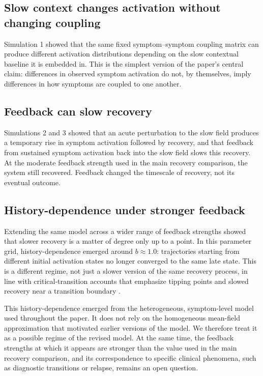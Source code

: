 \documentclass[man,12pt,floatsintext]{apa7}
\begin{document}
\subsection{Slow context changes activation without changing coupling}
Simulation 1 showed that the same fixed symptom--symptom coupling matrix can
produce different activation distributions depending on the slow contextual
baseline it is embedded in. This is the simplest version of the paper's central
claim: differences in observed symptom activation do not, by themselves, imply
differences in how symptoms are coupled to one another.

\subsection{Feedback can slow recovery}
Simulations 2 and 3 showed that an acute perturbation to the slow field
produces a temporary rise in symptom activation followed by recovery, and that
feedback from sustained symptom activation back into the slow field slows this
recovery. At the moderate feedback strength used in the main recovery
comparison, the system still recovered. Feedback changed the timescale of
recovery, not its eventual outcome.

\subsection{History-dependence under stronger feedback}
Extending the same model across a wider range of feedback strengths showed that
slower recovery is a matter of degree only up to a point. In this parameter
grid, history-dependence emerged around \(b\approx1.0\): trajectories starting
from different initial activation states no longer converged to the same late
state. This is a different regime, not just a slower version of the same
recovery process, in line with critical-transition accounts that emphasize
tipping points and slowed recovery near a transition boundary \parencite{van2014critical, scheffer2009early, helmich2021early}.

This history-dependence emerged from the heterogeneous, symptom-level model
used throughout the paper. It does not rely on the homogeneous mean-field
approximation that motivated earlier versions of the model. We therefore treat
it as a possible regime of the revised model. At the same time, the feedback
strengths at which it appears are stronger than the value used in the main
recovery comparison, and its correspondence to specific clinical phenomena,
such as diagnostic transitions or relapse, remains an open question.
\end{document}
